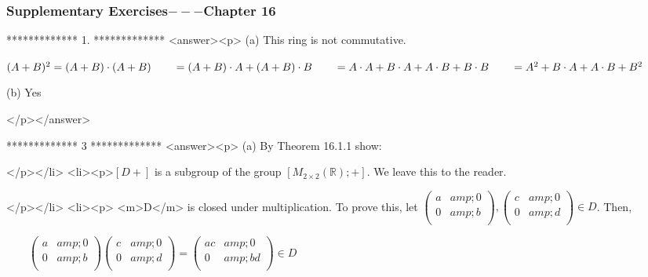 \subsubsection{Supplementary Exercises$---$Chapter 16}

*************
1.
*************
<answer><p> (a) This ring is not commutative.



\((A+B)^2= (A+B)\cdot (A+B)\\
\\
\quad \quad = (A+B)\cdot A+(A+B)\cdot B\\
\\
\quad \quad = A\cdot A+B\cdot A+A\cdot B+B\cdot B\\
\\
\quad \quad = A^2+ B\cdot A + A\cdot B + B^2\)



    (b) Yes

</p></answer>


*************
3
*************
<answer><p> (a) By Theorem 16.1.1 show:

</p></li>
<li><p>\([D +]\) is a subgroup of the group \(\left[M_{2\times 2}(\mathbb{R}); +\right]\). We leave this to the reader.

</p></li>
<li><p>  <m>D</m> is closed under multiplication.  To prove this, let \(\left(
\begin{array}{cc}
 a &amp; 0 \\
 0 &amp; b \\
\end{array}
\right), \left(
\begin{array}{cc}
 c &amp; 0 \\
 0 &amp; d \\
\end{array}
\right)\in D\).  Then,



$\quad \quad $\(\left(
\begin{array}{cc}
 a &amp; 0 \\
 0 &amp; b \\
\end{array}
\right) \left(
\begin{array}{cc}
 c &amp; 0 \\
 0 &amp; d \\
\end{array}
\right)= \left(
\begin{array}{cc}
 a c &amp; 0 \\
 0 &amp; b d \\
\end{array}
\right)\in D\)



